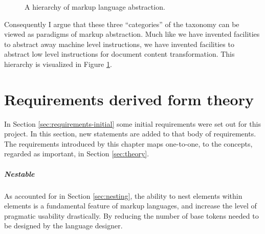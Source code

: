 \documentclass{scrreprt}
\begin{document}
\begin{figure}[h]
\centering


\caption{A hierarchy of markup language abstraction.}
\label{fig:markup-types-hierarchy}
\end{figure}



Consequently I argue that these three ``categories'' of the taxonomy can be viewed as paradigms of markup abstraction. Much like we have invented facilities to abstract away machine level instructions, we have invented facilities to abstract low level instructions for document content transformation. This hierarchy is visualized in Figure \ref{fig:markup-types-hierarchy}.  






\chapter{Requirements derived form theory}
In Section \ref{sec:requirements-initial} some initial requirements were set out for this project. In this section, new statements are added to that body of requirements. The requirements introduced by this chapter maps one-to-one, to the concepts, regarded as important, in Section \ref{sec:theory}.



\paragraph{Nestable}
As accounted for in Section \ref{sec:nesting}, the ability to nest elements within elements is a fundamental feature of markup languages, and increase the level of pragmatic usability drastically. By reducing the number of base tokens needed to be designed by the language designer.
\end{document}
